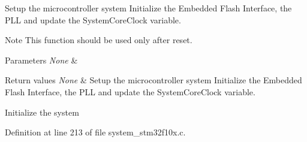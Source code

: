 Setup the microcontroller system Initialize the Embedded Flash Interface, the P\+LL and update the System\+Core\+Clock variable. 

\begin{DoxyNote}{Note}
This function should be used only after reset. 
\end{DoxyNote}

\begin{DoxyParams}{Parameters}
{\em None} & \\
\hline
\end{DoxyParams}

\begin{DoxyRetVals}{Return values}
{\em None} & Setup the microcontroller system Initialize the Embedded Flash Interface, the P\+LL and update the System\+Core\+Clock variable.\\
\hline
\end{DoxyRetVals}
Initialize the system 

Definition at line 213 of file system\+\_\+stm32f10x.\+c.

